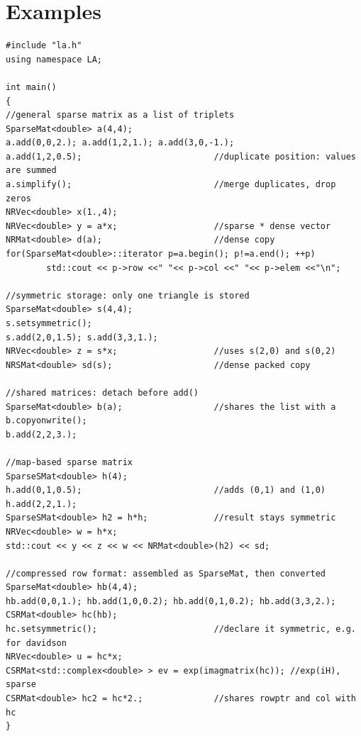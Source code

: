 \section{Examples}\label{sec:sparse:examples}
\begin{lstlisting}
#include "la.h"
using namespace LA;

int main()
{
//general sparse matrix as a list of triplets
SparseMat<double> a(4,4);
a.add(0,0,2.); a.add(1,2,1.); a.add(3,0,-1.);
a.add(1,2,0.5);                          //duplicate position: values are summed
a.simplify();                            //merge duplicates, drop zeros
NRVec<double> x(1.,4);
NRVec<double> y = a*x;                   //sparse * dense vector
NRMat<double> d(a);                      //dense copy
for(SparseMat<double>::iterator p=a.begin(); p!=a.end(); ++p)
        std::cout << p->row <<" "<< p->col <<" "<< p->elem <<"\n";

//symmetric storage: only one triangle is stored
SparseMat<double> s(4,4);
s.setsymmetric();
s.add(2,0,1.5); s.add(3,3,1.);
NRVec<double> z = s*x;                   //uses s(2,0) and s(0,2)
NRSMat<double> sd(s);                    //dense packed copy

//shared matrices: detach before add()
SparseMat<double> b(a);                  //shares the list with a
b.copyonwrite();
b.add(2,2,3.);

//map-based sparse matrix
SparseSMat<double> h(4);
h.add(0,1,0.5);                          //adds (0,1) and (1,0)
h.add(2,2,1.);
SparseSMat<double> h2 = h*h;             //result stays symmetric
NRVec<double> w = h*x;
std::cout << y << z << w << NRMat<double>(h2) << sd;

//compressed row format: assembled as SparseMat, then converted
SparseMat<double> hb(4,4);
hb.add(0,0,1.); hb.add(1,0,0.2); hb.add(0,1,0.2); hb.add(3,3,2.);
CSRMat<double> hc(hb);
hc.setsymmetric();                       //declare it symmetric, e.g. for davidson
NRVec<double> u = hc*x;
CSRMat<std::complex<double> > ev = exp(imagmatrix(hc)); //exp(iH), sparse
CSRMat<double> hc2 = hc*2.;              //shares rowptr and col with hc
}
\end{lstlisting}

